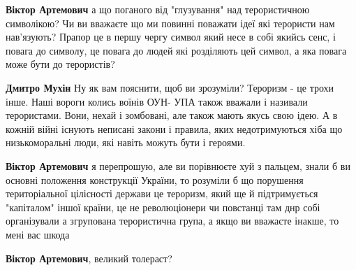 \begin{itemize}
\begin{itemize}
\begin{itemize}
 
\textbf{Віктор Артемович} а що поганого від "глузування" над терористичною
символікою? Чи ви вважаєте що ми повинні поважати ідеї які терористи нам
нав'язують? Прапор це в першу чергу символ який несе в собі якийсь сенс, і
повага до символу, це повага до людей які розділяють цей символ, а яка повага
може бути до терористів?

 
\textbf{Дмитро Мухін} Ну як вам пояснити, щоб ви зрозуміли? Тероризм - це трохи
інше. Наші вороги колись воїнів ОУН- УПА також вважали і називали терористами.
Вони, нехай і зомбовані, але також мають якусь свою ідею. А в кожній війні
існують неписані закони і правила, яких недотримуються хіба що низькоморальні
люди, які навіть можуть бути і героями.

 
\textbf{Віктор Артемович} я перепрошую, але ви порівнюєте хуй з пальцем, знали
б ви основні положення конструкції України, то розуміли б що порушення
територіальної цілісності держави це тероризм, який ще й підтримується
"капіталом" іншої країни, це не революціонери чи повстанці там днр собі
організували а згрупована терористична група, а якщо ви вважаєте інакше, то
мені вас шкода

 
\textbf{Віктор Артемович}, великий толераст?🤣🤣🤣

 

\end{itemize}
\end{itemize}
\end{itemize}
